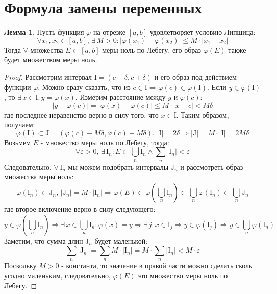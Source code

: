 \documentclass[12pt]{article}
\newcommand{\RN}[1]{%
	\textup{\uppercase\expandafter{\romannumeral#1}}%
}
\newcommand{\MI}{\mathrm{I}}
\newcommand{\MJ}{\mathrm{J}}
\newcommand{\VE}{\varepsilon}
\theoremstyle{definition}
\newtheorem{lemma}{Лемма}
\begin{document}
\lhead{Математический анализ - \RN{2}}

\section*{Формула замены переменных}

\begin{lemma}
	Пусть функция $\varphi$ на отрезке $[a,b]$ удовлетворяет условию Липшица:
	$$
		\forall x_1,x_2 \in [a,b], \, \exists \, M > 0 \colon |\varphi(x_1) - \varphi(x_2)| \leq M{\cdot}|x_1 - x_2|
	$$
	Тогда  $\forall$ множества $E \subset [a,b]$ меры ноль по Лебегу, его образ $\varphi(E)$ также будет множеством меры ноль.
\end{lemma}
\begin{proof}
	Рассмотрим интервал $\MI = (c - \delta, c + \delta)$ и его образ под действием функции $\varphi$. Можно сразу сказать, что из $c \in \MI \Rightarrow \varphi(c) \in \varphi(\MI)$. Если $y \in \varphi(\MI)$, то $\exists \, x \in \MI \colon y = \varphi(x)$. Измерим расстояние между $y$ и $\varphi(c)$:
	$$
		|y -\varphi(c)| = |\varphi(x) - \varphi(c)| \leq M{\cdot}|x-c| < M\delta
	$$
	где последнее неравенство верно в силу того, что $x \in \MI$. Таким образом, получаем: 
	$$
		\varphi(\MI) \subset \MJ = (\varphi(c) - M\delta, \varphi(c) + M\delta), \, |\MI| = 2\delta \Rightarrow |\MJ| = M{\cdot}|\MI| = 2M\delta
	$$
	Возьмем $E$ - множество меры ноль по Лебегу, тогда:
	$$
		\forall \VE > 0, \, \exists \, \MI_n \colon E \subset \bigcup\limits_n \MI_n \wedge \sum\limits_{n} |\MI_n| < \VE
	$$
	Следовательно, $\forall \, \MI_n$ мы можем подобрать интервалы $\MJ_n$ и рассмотреть образ множества меры ноль: 
	$$
		\varphi(\MI_n) \subset \MJ_n, \, |\MJ_n| = M{\cdot}|\MI_n| \Rightarrow \varphi(E) \subset \varphi\left(\bigcup\limits_n \MI_n\right) \subset \bigcup\limits_n \varphi(\MI_n) \subset \bigcup\limits_n \MJ_n
	$$
	где второе включение верно в силу следующего:
	$$
		y \in  \varphi\left(\bigcup\limits_n \MI_n\right) \Rightarrow \exists \, x \in \bigcup\limits_n \MI_n \colon \varphi(x) = y \Rightarrow \exists \, j \colon x \in \MI_j \Rightarrow y \in \varphi(\MI_j) \Rightarrow y \in \bigcup\limits_n \varphi(\MI_n)
	$$
	Заметим, что сумма длин $\MJ_n$ будет маленькой:
	$$
		\sum\limits_n |\MJ_n| = \sum\limits_n M{\cdot}|\MI_n| = M{\cdot}\!\sum\limits_n |\MI_n| < M{\cdot}\VE
	$$
	Поскольку $M > 0$ - константа, то значение в правой части можно сделать сколь угодно маленьким, следовательно, $\varphi(E)$ это множество меры ноль по Лебегу.
\end{proof}
\end{document}
